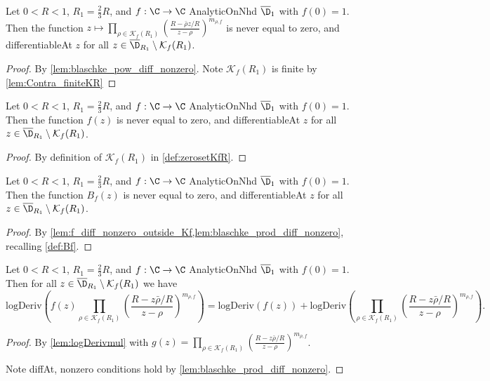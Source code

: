 \begin{lemma}\label{lem:blaschke_prod_diff_nonzero} 
\leanok
Let $0<R<1$, $R_1=\frac{2}{3}R$, and $f:\C\to\C$ AnalyticOnNhd $\overline{\D}_1$ with $f(0)=1$. Then the function $z \mapsto \prod_{\rho\in \mathcal K_f(R_1)} (\frac{R-\bar\rho z/R}{z-\rho})^{m_{\rho,f}}$ is never equal to zero, and differentiableAt $z$ for all $z\in \overline{\D}_{R_1}\setminus\mathcal K_f(R_1)$.
\end{lemma}
\begin{proof}
\leanok
{}
By \cref{lem:blaschke_pow_diff_nonzero}. Note $\mathcal K_f(R_1)$ is finite by \cref{lem:Contra_finiteKR}
\end{proof}

\begin{lemma}\label{lem:f_diff_nonzero_outside_Kf} 
\leanok
Let $0<R<1$, $R_1=\frac{2}{3}R$, and $f:\C\to\C$ AnalyticOnNhd $\overline{\D}_1$ with $f(0)=1$. Then the function $f(z)$ is never equal to zero, and differentiableAt $z$ for all $z\in \overline{\D}_{R_1}\setminus\mathcal K_f(R_1)$.
\end{lemma}
\begin{proof}
\leanok
{}
By definition of $\mathcal{K}_f(R_1)$ in \cref{def:zerosetKfR}.
\end{proof}

\begin{lemma}\label{lem:Bf_diff_nonzero_outside_Kf} 
\leanok
Let $0<R<1$, $R_1=\frac{2}{3}R$, and $f:\C\to\C$ AnalyticOnNhd $\overline{\D}_1$ with $f(0)=1$. Then the function $B_f(z)$ is never equal to zero, and differentiableAt $z$ for all $z\in \overline{\D}_{R_1}\setminus\mathcal K_f(R_1)$.
\end{lemma}
\begin{proof}
\leanok
{}
By \cref{lem:f_diff_nonzero_outside_Kf,lem:blaschke_prod_diff_nonzero}, recalling \cref{def:Bf}.
\end{proof}


\begin{lemma}\label{lem:logDeriv_fprod_is_sum} 
\leanok
Let $0<R<1$, $R_1=\frac{2}{3}R$, and $f:\C\to\C$ AnalyticOnNhd $\overline{\D}_1$ with $f(0)=1$. Then for all $z\in \overline{\D}_{R_1}\setminus\mathcal K_f(R_1)$ we have
\[\text{logDeriv}\left(f(z)\prod_{\rho\in\mathcal K_f(R_1)}\left(\frac{R-z\bar\rho/R}{z-\rho}\right)^{m_{\rho,f}}\right)=\text{logDeriv}(f(z)) + \text{logDeriv}\left(\prod_{\rho\in\mathcal K_f(R_1)}\left(\frac{R-z\bar\rho/R}{z-\rho}\right)^{m_{\rho,f}}\right).\]
\end{lemma}
\begin{proof}
\leanok
{}
By \cref{lem:logDerivmul} with $g(z)=\prod_{\rho\in\mathcal K_f(R_1)}\left(\frac{R-z\bar\rho/R}{z-\rho}\right)^{m_{\rho,f}}$.

Note diffAt, nonzero conditions hold by \cref{lem:blaschke_prod_diff_nonzero}.
\end{proof}

